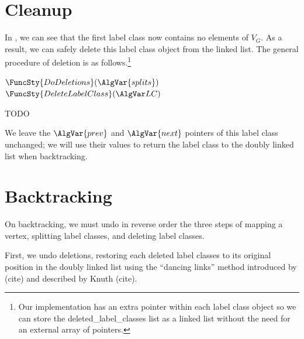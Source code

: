 \section{Cleanup}

In , we can see that the first label class
now contains no elements of $V_G$.  As a result, we can safely delete this label
class object from the linked list.  The general procedure of deletion is as
follows.\footnote{Our implementation has an extra pointer within each label
class object so we can store the deleted\_label\_classes list as a linked list
without the need for an external array of pointers.}


\begin{algorithm}[h!]
\DontPrintSemicolon
\nl $\FuncSty{DoDeletions}(\AlgVar{splits})$ \;
\nl {}
\;
\nl $\FuncSty{DeleteLabelClass}(\LC)$ \;
\nl {}
\caption{TODO}
\label{McSplitSIAlgDelete}
\end{algorithm}

We leave the $\AlgVar{prev}$ and $\AlgVar{next}$ 
pointers of this label class unchanged; we will use their values to return
the label class to the doubly linked list when backtracking.

\section{Backtracking}

On backtracking, we must undo in reverse order the three steps of
mapping a vertex, splitting label classes, and deleting label classes.

First, we undo deletions, restoring each deleted label classes to its
original position in the doubly linked list using the ``dancing links'' method
introduced by (cite) and described by Knuth (cite).

